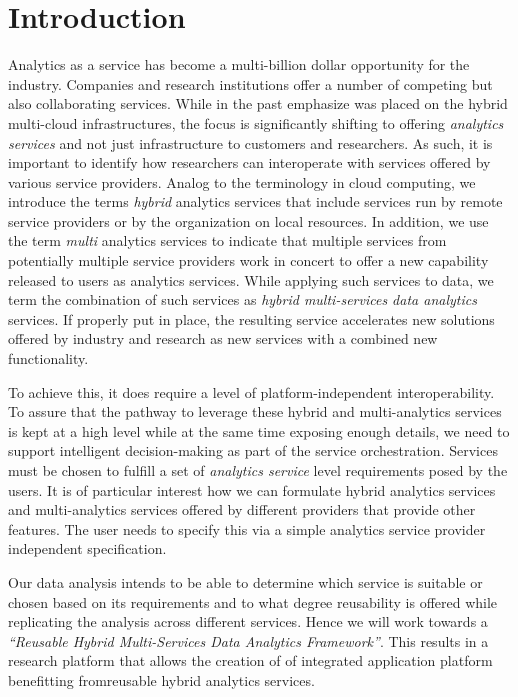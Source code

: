 
\section{Introduction}
\label{sec:summary}


Analytics as a service has become a multi-billion dollar opportunity
for the industry. Companies and research institutions offer a number
of competing but also collaborating services. While in the past
emphasize was placed on the hybrid multi-cloud infrastructures, the
focus is significantly shifting to offering {\em analytics services}
and not just infrastructure to customers and researchers. As such, it
is important to identify how researchers can interoperate with
services offered by various service providers. Analog to the
terminology in cloud computing, we introduce the terms {\em hybrid}
analytics services that include services run by remote service
providers or by the organization on local resources. In addition, we
use the term {\em multi} analytics services to indicate that multiple
services from potentially multiple service providers work in concert
to offer a new capability released to users as analytics
services. While applying such services to data, we term the
combination of such services as {\em hybrid multi-services data
  analytics} services. If properly put in place, the resulting service
accelerates new solutions offered by industry and research as new
services with a combined new functionality.

To achieve this, it does require a level of platform-independent
interoperability.  To assure that the pathway to
leverage these hybrid and multi-analytics services is kept at a high level
while at the same time exposing enough details, we need to support
intelligent decision-making as part of the service
orchestration. Services must be chosen to fulfill a set of {\em
  analytics service} level requirements posed by the users. It is of particular
interest how we can formulate hybrid analytics services and
multi-analytics services offered by different providers that provide
other features. The user needs to specify this via a simple analytics
service provider independent specification.

Our data analysis intends to be able to determine which service is
suitable or chosen based on its requirements and to what degree
reusability is offered while replicating the analysis across different
services. Hence we will work towards a {\em ``Reusable Hybrid
Multi-Services Data Analytics Framework''}. This results in a research
platform that allows the creation of of integrated application
platform benefitting fromreusable hybrid analytics services.


